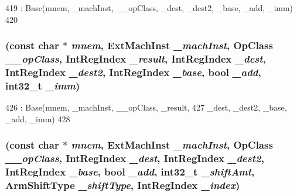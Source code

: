 \begin{DoxyCode}
419         : Base(mnem, _machInst, __opClass, _dest, _dest2, _base, _add, _imm)
420     {}
\end{DoxyCode}
\hypertarget{classArmISA_1_1MemoryPreIndex_a3da1a9581c562c1bc28eb7fdac4dbc0f}{
\subsubsection[{MemoryPreIndex}]{ (const char $\ast$ {\em mnem}, \/  ExtMachInst {\em \_\-machInst}, \/  OpClass {\em \_\-\_\-opClass}, \/  {\bf IntRegIndex} {\em \_\-result}, \/  {\bf IntRegIndex} {\em \_\-dest}, \/  {\bf IntRegIndex} {\em \_\-dest2}, \/  {\bf IntRegIndex} {\em \_\-base}, \/  bool {\em \_\-add}, \/  int32\_\-t {\em \_\-imm})}}
\label{classArmISA_1_1MemoryPreIndex_a3da1a9581c562c1bc28eb7fdac4dbc0f}



\begin{DoxyCode}
426         : Base(mnem, _machInst, __opClass, _result,
427                 _dest, _dest2, _base, _add, _imm)
428     {}
\end{DoxyCode}
\hypertarget{classArmISA_1_1MemoryPreIndex_aae533a646860c37910df38f801de1462}{
\subsubsection[{MemoryPreIndex}]{ (const char $\ast$ {\em mnem}, \/  ExtMachInst {\em \_\-machInst}, \/  OpClass {\em \_\-\_\-opClass}, \/  {\bf IntRegIndex} {\em \_\-dest}, \/  {\bf IntRegIndex} {\em \_\-dest2}, \/  {\bf IntRegIndex} {\em \_\-base}, \/  bool {\em \_\-add}, \/  int32\_\-t {\em \_\-shiftAmt}, \/  {\bf ArmShiftType} {\em \_\-shiftType}, \/  {\bf IntRegIndex} {\em \_\-index})}}
\label{classArmISA_1_1MemoryPreIndex_aae533a646860c37910df38f801de1462}




